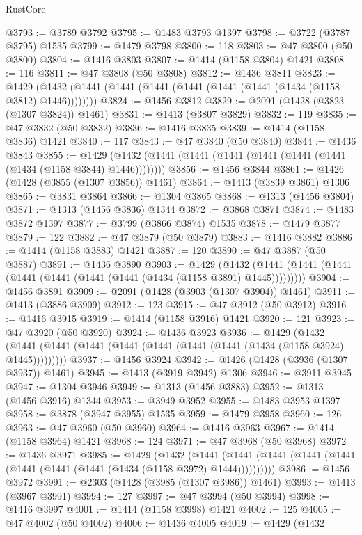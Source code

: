 \begin{lexlean}{RustCore}
\begin{coremodule}
@3793 := @3789 @3792
@3795 := @1483 @3793 @1397
@3798 := @3722 (@3787 @3795) @1535
@3799 := @1479 @3798
@3800 := 118
@3803 := @47 @3800 (@50 @3800)
@3804 := @1416 @3803
@3807 := @1414 (@1158 @3804) @1421
@3808 := 116
@3811 := @47 @3808 (@50 @3808)
@3812 := @1436 @3811
@3823 := @1429 (@1432 (@1441 (@1441 (@1441 (@1441 (@1441 (@1441 (@1434 (@1158 @3812) @1446))))))))
@3824 := @1456 @3812
@3829 := @2091 (@1428 (@3823 (@1307 @3824)) @1461)
@3831 := @1413 (@3807 @3829)
@3832 := 119
@3835 := @47 @3832 (@50 @3832)
@3836 := @1416 @3835
@3839 := @1414 (@1158 @3836) @1421
@3840 := 117
@3843 := @47 @3840 (@50 @3840)
@3844 := @1436 @3843
@3855 := @1429 (@1432 (@1441 (@1441 (@1441 (@1441 (@1441 (@1441 (@1434 (@1158 @3844) @1446))))))))
@3856 := @1456 @3844
@3861 := @1426 (@1428 (@3855 (@1307 @3856)) @1461)
@3864 := @1413 (@3839 @3861) @1306
@3865 := @3831 @3864
@3866 := @1304 @3865
@3868 := @1313 (@1456 @3804)
@3871 := @1313 (@1456 @3836) @1344
@3872 := @3868 @3871
@3874 := @1483 @3872 @1397
@3877 := @3799 (@3866 @3874) @1535
@3878 := @1479 @3877
@3879 := 122
@3882 := @47 @3879 (@50 @3879)
@3883 := @1416 @3882
@3886 := @1414 (@1158 @3883) @1421
@3887 := 120
@3890 := @47 @3887 (@50 @3887)
@3891 := @1436 @3890
@3903 := @1429
    (@1432 (@1441 (@1441 (@1441 (@1441 (@1441 (@1441 (@1441 (@1434 (@1158 @3891) @1445)))))))))
@3904 := @1456 @3891
@3909 := @2091 (@1428 (@3903 (@1307 @3904)) @1461)
@3911 := @1413 (@3886 @3909)
@3912 := 123
@3915 := @47 @3912 (@50 @3912)
@3916 := @1416 @3915
@3919 := @1414 (@1158 @3916) @1421
@3920 := 121
@3923 := @47 @3920 (@50 @3920)
@3924 := @1436 @3923
@3936 := @1429
    (@1432 (@1441 (@1441 (@1441 (@1441 (@1441 (@1441 (@1441 (@1434 (@1158 @3924) @1445)))))))))
@3937 := @1456 @3924
@3942 := @1426 (@1428 (@3936 (@1307 @3937)) @1461)
@3945 := @1413 (@3919 @3942) @1306
@3946 := @3911 @3945
@3947 := @1304 @3946
@3949 := @1313 (@1456 @3883)
@3952 := @1313 (@1456 @3916) @1344
@3953 := @3949 @3952
@3955 := @1483 @3953 @1397
@3958 := @3878 (@3947 @3955) @1535
@3959 := @1479 @3958
@3960 := 126
@3963 := @47 @3960 (@50 @3960)
@3964 := @1416 @3963
@3967 := @1414 (@1158 @3964) @1421
@3968 := 124
@3971 := @47 @3968 (@50 @3968)
@3972 := @1436 @3971
@3985 := @1429
    (@1432
      (@1441 (@1441 (@1441 (@1441 (@1441 (@1441 (@1441 (@1441 (@1434 (@1158 @3972) @1444))))))))))
@3986 := @1456 @3972
@3991 := @2303 (@1428 (@3985 (@1307 @3986)) @1461)
@3993 := @1413 (@3967 @3991)
@3994 := 127
@3997 := @47 @3994 (@50 @3994)
@3998 := @1416 @3997
@4001 := @1414 (@1158 @3998) @1421
@4002 := 125
@4005 := @47 @4002 (@50 @4002)
@4006 := @1436 @4005
@4019 := @1429
    (@1432

\end{coremodule}
\end{lexlean}
